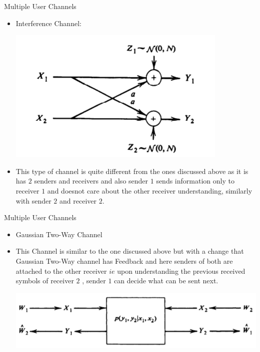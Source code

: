 \documentclass{beamer}
\begin{document}
\begin{frame}{Multiple User Channels}
 \begin{itemize}
	\justifying
\item Interference Channel:
\begin{center}
	\includegraphics[scale=0.2]{Diagrams/Gaussian_Interference_Channel.png}
\end{center} 
\item This type of channel is quite different from the ones discussed above as it is has $2$ senders and receivers and also sender $1$ sends information only to receiver $1$ and doesnot care about the other receiver understanding, similarly with sender $2$ and receiver $2$.




	\end{itemize}
\end{frame}
\begin{frame}{Multiple User Channels}
 \begin{itemize}
	\justifying
\item    Gaussian Two-Way Channel
\item This Channel is similar to the one discussed above but with a change that Gaussian Two-Way channel has Feedback and here senders of both are attached to the other receiver $ie$ upon understanding the previous received symbols of receiver $2$ , sender $1$ can decide what can be sent next.
\begin{center}
	\includegraphics[scale=0.5]{Diagrams/Gaussian_Two-Way_Channel.png}
\end{center} 




	\end{itemize}
\end{frame}
\end{document}
